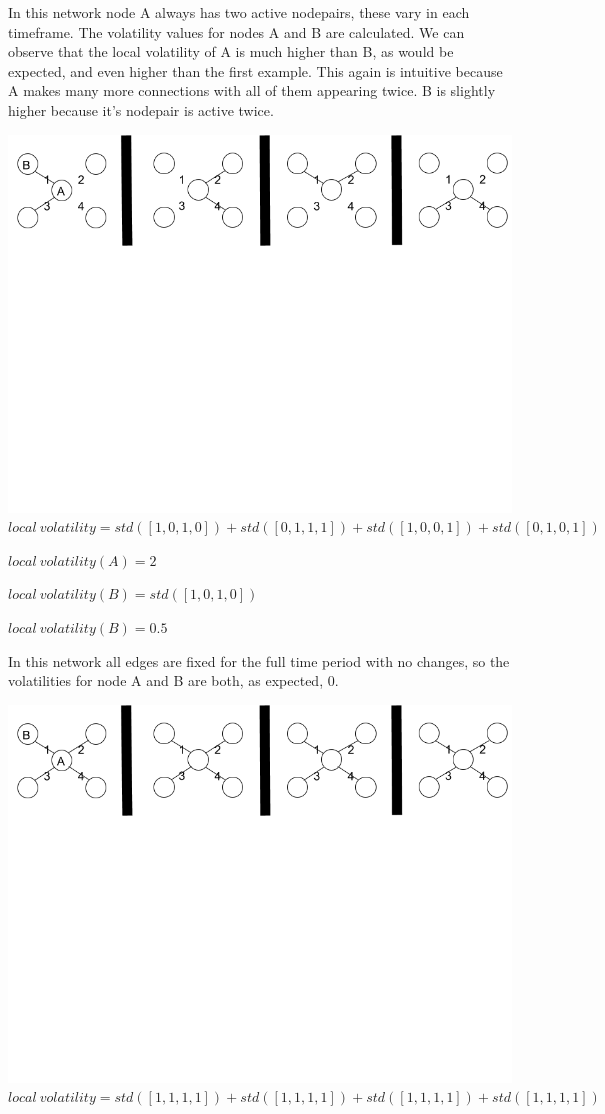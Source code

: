 \documentclass[oneside,12pt]{Classes/RoboticsLaTeX}
\begin{document}
\begin{appendices}
In this network node A always has two active nodepairs, these vary in each timeframe. The volatility values for nodes A and B are calculated. We can observe that the local volatility of A is much higher than B, as would be expected, and even higher than the first example. This again is intuitive because A makes many more connections with all of them appearing twice. B is slightly higher because it's nodepair is active twice.
\begin{center}
\includegraphics[trim={0 15cm 0 0}, width=140mm]{./Figures/volatilityAppendix3.png}
$local\ volatility = std([1,0,1,0]) + std([0,1,1,1]) + std([1,0,0,1]) + std([0,1,0,1])$

$local\ volatility(A) = 2$

$local\ volatility(B) = std([1,0,1,0])$

$local\ volatility(B) = 0.5$
\end{center}

In this network all edges are fixed for the full time period with no changes, so the volatilities for node A and B are both, as expected, 0.
\begin{center}
\includegraphics[trim={0 15cm 0 0}, width=140mm]{./Figures/volatilityAppendix4.png}
$local\ volatility = std([1,1,1,1]) + std([1,1,1,1]) + std([1,1,1,1]) + std([1,1,1,1])$


\end{center}
\end{appendices}
\end{document}
